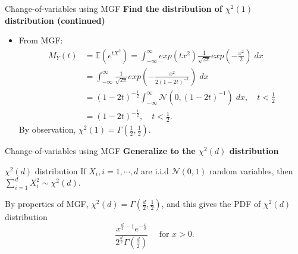 \documentclass [aspectratio=169]{beamer}
\newcommand{\mc}{\mathcal}
\begin{document}
\begin{frame}{Change-of-variables using MGF}
     \textbf{Find the distribution of $\chi^2(1)$ distribution (continued)}\\
     \vspace{0.1in}
     \begin{itemize}
         \item From MGF: \\
        \begin{equation*}
        \begin{aligned}
            M_Y(t) &= \mathbb{E}(e^{tX^2}) = \int_{-\infty}^{\infty} exp({tx^2})\frac{1}{\sqrt{2\pi}}exp(-\frac{x^2}{2})\; dx\\
            & = \int_{-\infty}^{\infty} \frac{1}{\sqrt{2\pi}}exp\left(-\frac{x^2}{2(1-2t)^{-1}}\right)\; dx\\
            & = (1-2t)^{-\frac{1}{2}} \int_{-\infty}^{\infty} \mc{N}(0, (1-2t)^{-1})\; dx, \quad t < \frac{1}{2}\\
            & = (1-2t)^{-\frac{1}{2}}, \quad t < \frac{1}{2}.
        \end{aligned}
        \end{equation*}
        By observation, $\chi^2(1) = \Gamma(\frac{1}{2}, \frac{1}{2})$.
     \end{itemize}
\end{frame}

\begin{frame}{Change-of-variables using MGF}
    \textbf{Generalize to the $\chi^2(d)$ distribution}
    \begin{block}{$\chi^2(d)$ distribution}
       If $X_i, i = 1, \cdots, d$ are i.i.d $\mc{N}(0,1)$ random variables, then $\sum_{i=1}^d X_i^2 \sim \chi^2(d)$.
    \end{block}
    \vspace{0.1in}
    By properties of MGF, $\chi^2(d) = \Gamma(\frac{d}{2}, \frac{1}{2})$, and this gives the PDF of $\chi^2(d)$ distribution
    $$
    {\frac {x^{\frac{d}{2} -1}e^{-\frac{x}{2}}}{2^{\frac{d}{2}}\Gamma (\frac{d}{2} )}}\quad {\text{ for }}x>0.
    $$
\end{frame}
\end{document}
